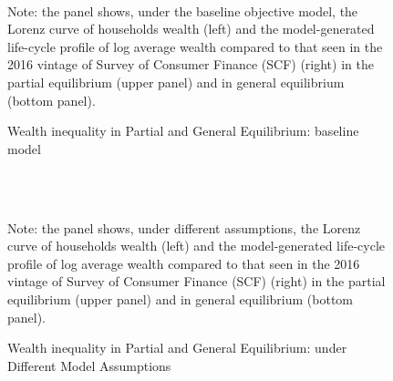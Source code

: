 \begin{figure}[!ht]
	\caption{Wealth inequality in Partial and General Equilibrium: baseline model}
	\label{fig:StE_dist_objective}
	\begin{center}
	 \\
		
	
\end{center}
\begin{flushleft}Note: the panel shows, under the baseline objective model, the Lorenz curve of households wealth (left) and the model-generated life-cycle profile of log average wealth compared to that seen in the 2016 vintage of Survey of Consumer Finance (SCF) (right) in the partial equilibrium (upper panel) and in general equilibrium (bottom panel). \end{flushleft}
\end{figure}


\begin{figure}[!ht]
	\caption{Wealth inequality in Partial and General Equilibrium: under Different Model Assumptions}
	\label{fig:StE_dist_compare}
	\begin{center}
	 \\
	 \\
	
\end{center}
\begin{flushleft}Note: the panel shows, under different assumptions, the Lorenz curve of households wealth (left) and the model-generated life-cycle profile of log average wealth compared to that seen in the 2016 vintage of Survey of Consumer Finance (SCF) (right) in the partial equilibrium (upper panel) and in general equilibrium (bottom panel). \end{flushleft}
\end{figure}


